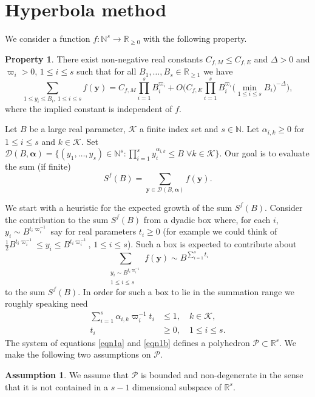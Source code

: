 \documentclass[11pt]{article}
\numberwithin{equation}{section}
\newcommand{\cD}{\mathcal{D}}
\newcommand{\cBalp}{\cD(B,\bfalp)}
\let\vardel\varDelta
\newcommand{\bfy}{\boldsymbol{y}}
\newcommand{\bfalp}{\boldsymbol{\alpha}}
\newcommand{\calK}{\mathcal{K}}
\newcommand{\calP}{\mathcal{P}}
\newcommand\NN{\mathbb{N}}
\newcommand{\N}{\mathbb{N}}
\newcommand\R{\mathbb{R}}
\theoremstyle{definition}
\newtheorem{assumption}[theorem]{Assumption}
\newtheorem{property}{Property}
\numberwithin{theorem}{section}
\begin{document}
\section{Hyperbola method}
\label{sec:hyperbola_method}

We consider a function $f: \N^s\rightarrow \R_{\geq 0}$ with the following property.

\begin{property}\label{property:I}
There exist non-negative real constants $C_{f,M}\leq C_{f,E}$ and $\vardel>0$ and $\varpi_i>0$, $1\leq i\leq s$ such that for all $B_1,\ldots, B_s\in \R_{\geq 1}$ we have\vspace*{-3pt}
\[
\sum_{1\leq y_i\leq B_i,\ 1\leq i\leq s} f(\bfy)= C_{f,M} \prod_{i=1}^s B_i^{\varpi_i} +O\biggl(C_{f,E} \prod_{i=1}^s B_i^{\varpi_i} \bigl(\min_{1\leq i\leq s} B_i\bigr)^{-\vardel}\biggr),
\]
where the implied constant is independent of $f$.
\end{property}

Let $B$ be a large real parameter, $\calK$ a finite index set and $s\in \N$. Let $\alpha_{i,k}\geq 0$ for $1\leq i\leq s$ and $k\in \calK$. Set $\cBalp=\{(y_1,\dots,y_s)\in\NN^s:\prod_{i=1}^sy_i^{\alpha_{i,k}}\leq B\;\forall k\in\calK\}$. Our goal is to evaluate the sum (if finite)\vspace*{-3pt}
\[
S^{f}(B)=\sum_{\bfy\in\cBalp}f(\bfy).
\]

We start with a heuristic for the expected growth of the sum $S^f(B)$. Consider the contribution to the sum $S^f(B)$ from a dyadic box where, for each $i$, $y_i\sim B^{t_i\varpi_i^{-1}}$ say for real parameters $t_i\geq 0$ (for example we could think of $\tfrac{1}{2} B^{t_i\varpi_i^{-1}}\leq y_i\leq B^{t_i\varpi_i^{-1}}$, $1\leq i\leq s$). Such a box is expected to contribute about
\[
\sum_{\substack{y_i\sim B^{t_i\varpi_i^{-1}}\\ 1\leq i\leq s}} f(\bfy) \sim B^{\sum_{i=1}^s t_i}
\]
to the sum $S^f(B)$.
In order for such a box to lie in the summation range we roughly speaking need\vspace*{-4pt}
\begin{align}\label{eqn1a}
\sum_{i=1}^s \alpha_{i,k} \varpi_i^{-1} t_i&\leq 1, \quad k\in \calK,
\\
\label{eqn1b}
t_i&\geq 0,\quad 1\leq i\leq s.
\end{align}
The system of equations \eqref{eqn1a} and \eqref{eqn1b} defines a polyhedron $\calP \subset \R^s$. We make the following two assumptions on $\calP$.

\begin{assumption}\label{assp10}
We assume that $\calP$ is bounded and non-degenerate in the sense that it is not contained in a $s-1$ dimensional subspace of $\R^s$.
\end{assumption}
\end{document}
